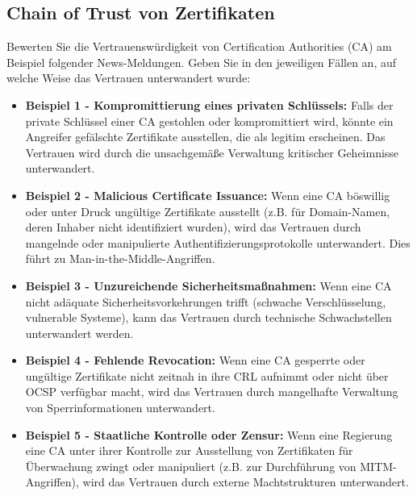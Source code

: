 \documentclass[a4paper]{article}
\begin{document}
\subsection{Chain of Trust von Zertifikaten}

Bewerten Sie die Vertrauenswürdigkeit von Certification Authorities (CA) am Beispiel folgender News-Meldungen. Geben Sie in den jeweiligen Fällen an, auf welche Weise das Vertrauen unterwandert wurde:

\begin{itemize}
    \item \textbf{Beispiel 1 - Kompromittierung eines privaten Schlüssels:} Falls der private Schlüssel einer CA gestohlen oder kompromittiert wird, könnte ein Angreifer gefälschte Zertifikate ausstellen, die als legitim erscheinen. Das Vertrauen wird durch die unsachgemäße Verwaltung kritischer Geheimnisse unterwandert.
    
    \item \textbf{Beispiel 2 - Malicious Certificate Issuance:} Wenn eine CA böswillig oder unter Druck ungültige Zertifikate ausstellt (z.B. für Domain-Namen, deren Inhaber nicht identifiziert wurden), wird das Vertrauen durch mangelnde oder manipulierte Authentifizierungsprotokolle unterwandert. Dies führt zu Man-in-the-Middle-Angriffen.
    
    \item \textbf{Beispiel 3 - Unzureichende Sicherheitsmaßnahmen:} Wenn eine CA nicht adäquate Sicherheitsvorkehrungen trifft (schwache Verschlüsselung, vulnerable Systeme), kann das Vertrauen durch technische Schwachstellen unterwandert werden.
    
    \item \textbf{Beispiel 4 - Fehlende Revocation:} Wenn eine CA gesperrte oder ungültige Zertifikate nicht zeitnah in ihre CRL aufnimmt oder nicht über OCSP verfügbar macht, wird das Vertrauen durch mangelhafte Verwaltung von Sperrinformationen unterwandert.
    
    \item \textbf{Beispiel 5 - Staatliche Kontrolle oder Zensur:} Wenn eine Regierung eine CA unter ihrer Kontrolle zur Ausstellung von Zertifikaten für Überwachung zwingt oder manipuliert (z.B. zur Durchführung von MITM-Angriffen), wird das Vertrauen durch externe Machtstrukturen unterwandert.
\end{itemize}
\end{document}
